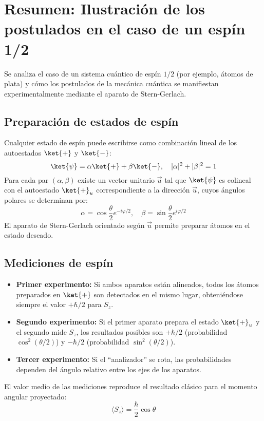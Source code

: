 \section*{Resumen: Ilustración de los postulados en el caso de un espín 1/2}

Se analiza el caso de un sistema cuántico de espín $1/2$ (por ejemplo, átomos de plata) y cómo los postulados de la mecánica cuántica se manifiestan experimentalmente mediante el aparato de Stern-Gerlach.

\subsection*{Preparación de estados de espín}

Cualquier estado de espín puede escribirse como combinación lineal de los autoestados $\ket{+}$ y $\ket{-}$:
\[
\ket{\psi} = \alpha \ket{+} + \beta \ket{-}, \quad |\alpha|^2 + |\beta|^2 = 1
\]
Para cada par $(\alpha, \beta)$ existe un vector unitario $\vec{u}$ tal que $\ket{\psi}$ es colineal con el autoestado $\ket{+}_u$ correspondiente a la dirección $\vec{u}$, cuyos ángulos polares se determinan por:
\[
\alpha = \cos\frac{\theta}{2} e^{-i\varphi/2}, \quad \beta = \sin\frac{\theta}{2} e^{i\varphi/2}
\]
El aparato de Stern-Gerlach orientado según $\vec{u}$ permite preparar átomos en el estado deseado.

\subsection*{Mediciones de espín}

\begin{itemize}
    \item \textbf{Primer experimento:} Si ambos aparatos están alineados, todos los átomos preparados en $\ket{+}$ son detectados en el mismo lugar, obteniéndose siempre el valor $+\hbar/2$ para $S_z$.
    \item \textbf{Segundo experimento:} Si el primer aparato prepara el estado $\ket{+}_u$ y el segundo mide $S_z$, los resultados posibles son $+\hbar/2$ (probabilidad $\cos^2(\theta/2)$) y $-\hbar/2$ (probabilidad $\sin^2(\theta/2)$).
    \item \textbf{Tercer experimento:} Si el “analizador” se rota, las probabilidades dependen del ángulo relativo entre los ejes de los aparatos.
\end{itemize}

El valor medio de las mediciones reproduce el resultado clásico para el momento angular proyectado:
\[
\langle S_z \rangle = \frac{\hbar}{2} \cos\theta
\]

